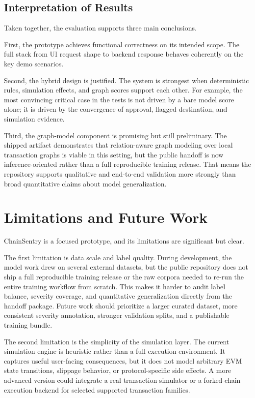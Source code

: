\documentclass[11pt]{article}
\begin{document}
\subsection{Interpretation of Results}

Taken together, the evaluation supports three main conclusions.

First, the prototype achieves functional correctness on its intended scope. The full stack from UI request shape to backend response behaves coherently on the key demo scenarios.

Second, the hybrid design is justified. The system is strongest when deterministic rules, simulation effects, and graph scores support each other. For example, the most convincing critical case in the tests is not driven by a bare model score alone; it is driven by the convergence of approval, flagged destination, and simulation evidence.

Third, the graph-model component is promising but still preliminary. The shipped artifact demonstrates that relation-aware graph modeling over local transaction graphs is viable in this setting, but the public handoff is now inference-oriented rather than a full reproducible training release. That means the repository supports qualitative and end-to-end validation more strongly than broad quantitative claims about model generalization.

\section{Limitations and Future Work}

ChainSentry is a focused prototype, and its limitations are significant but clear.

The first limitation is data scale and label quality. During development, the model work drew on several external datasets, but the public repository does not ship a full reproducible training release or the raw corpora needed to re-run the entire training workflow from scratch. This makes it harder to audit label balance, severity coverage, and quantitative generalization directly from the handoff package. Future work should prioritize a larger curated dataset, more consistent severity annotation, stronger validation splits, and a publishable training bundle.

The second limitation is the simplicity of the simulation layer. The current simulation engine is heuristic rather than a full execution environment. It captures useful user-facing consequences, but it does not model arbitrary EVM state transitions, slippage behavior, or protocol-specific side effects. A more advanced version could integrate a real transaction simulator or a forked-chain execution backend for selected supported transaction families.
\end{document}
